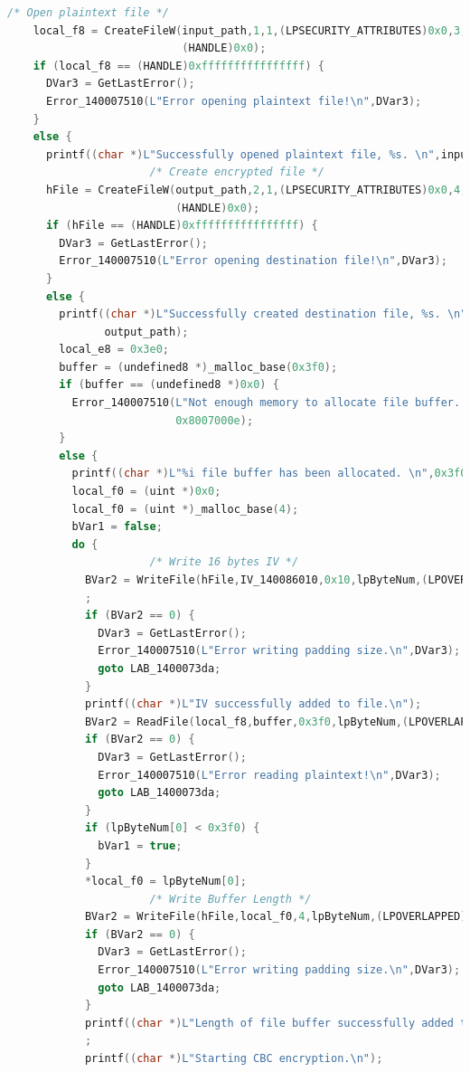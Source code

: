 \documentclass[11pt]{article}
\begin{document}
\begin{lstlisting}[language=c++, caption=AES\_Encrypt\_140007080]
    /* Open plaintext file */
    local_f8 = CreateFileW(input_path,1,1,(LPSECURITY_ATTRIBUTES)0x0,3,0x80,
                           (HANDLE)0x0);
    if (local_f8 == (HANDLE)0xffffffffffffffff) {
      DVar3 = GetLastError();
      Error_140007510(L"Error opening plaintext file!\n",DVar3);
    }
    else {
      printf((char *)L"Successfully opened plaintext file, %s. \n",input_path);
                      /* Create encrypted file */
      hFile = CreateFileW(output_path,2,1,(LPSECURITY_ATTRIBUTES)0x0,4,0x80,
                          (HANDLE)0x0);
      if (hFile == (HANDLE)0xffffffffffffffff) {
        DVar3 = GetLastError();
        Error_140007510(L"Error opening destination file!\n",DVar3);
      }
      else {
        printf((char *)L"Successfully created destination file, %s. \n",
               output_path);
        local_e8 = 0x3e0;
        buffer = (undefined8 *)_malloc_base(0x3f0);
        if (buffer == (undefined8 *)0x0) {
          Error_140007510(L"Not enough memory to allocate file buffer. \n",
                          0x8007000e);
        }
        else {
          printf((char *)L"%i file buffer has been allocated. \n",0x3f0);
          local_f0 = (uint *)0x0;
          local_f0 = (uint *)_malloc_base(4);
          bVar1 = false;
          do {
                      /* Write 16 bytes IV */
            BVar2 = WriteFile(hFile,IV_140086010,0x10,lpByteNum,(LPOVERLAPPED)0x0)
            ;
            if (BVar2 == 0) {
              DVar3 = GetLastError();
              Error_140007510(L"Error writing padding size.\n",DVar3);
              goto LAB_1400073da;
            }
            printf((char *)L"IV successfully added to file.\n");
            BVar2 = ReadFile(local_f8,buffer,0x3f0,lpByteNum,(LPOVERLAPPED)0x0);
            if (BVar2 == 0) {
              DVar3 = GetLastError();
              Error_140007510(L"Error reading plaintext!\n",DVar3);
              goto LAB_1400073da;
            }
            if (lpByteNum[0] < 0x3f0) {
              bVar1 = true;
            }
            *local_f0 = lpByteNum[0];
                      /* Write Buffer Length */
            BVar2 = WriteFile(hFile,local_f0,4,lpByteNum,(LPOVERLAPPED)0x0);
            if (BVar2 == 0) {
              DVar3 = GetLastError();
              Error_140007510(L"Error writing padding size.\n",DVar3);
              goto LAB_1400073da;
            }
            printf((char *)L"Length of file buffer successfully added to file.\n")
            ;
            printf((char *)L"Starting CBC encryption.\n");

\end{lstlisting}
\end{document}
